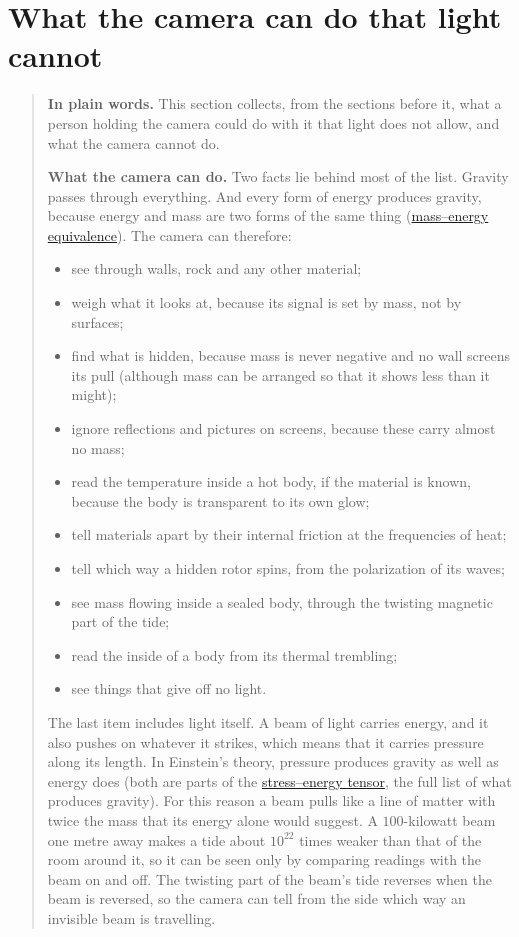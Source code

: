 \section{What the camera can do that light cannot}\label{sec:affordances}

\begin{quote}
\textbf{In plain words.} This section collects, from the sections before it,
what a person holding the camera could do with it that light does not allow,
and what the camera cannot do.

\textbf{What the camera can do.} Two facts lie behind most of the list. Gravity
passes through everything. And every form of energy produces gravity, because
energy and mass are two forms of the same thing
(\href{https://en.wikipedia.org/wiki/Mass-energy_equivalence}{mass--energy
equivalence}). The camera can therefore:
\begin{itemize}
\item see through walls, rock and any other material;
\item weigh what it looks at, because its signal is set by mass, not by
surfaces;
\item find what is hidden, because mass is never negative and no wall screens
its pull (although mass can be arranged so that it shows less than it might);
\item ignore reflections and pictures on screens, because these carry almost
no mass;
\item read the temperature inside a hot body, if the material is known,
because the body is transparent to its own glow;
\item tell materials apart by their internal friction at the frequencies of
heat;
\item tell which way a hidden rotor spins, from the polarization of its waves;
\item see mass flowing inside a sealed body, through the twisting magnetic part
of the tide;
\item read the inside of a body from its thermal trembling;
\item see things that give off no light.
\end{itemize}

The last item includes light itself. A beam of light carries energy, and it
also pushes on whatever it strikes, which means that it carries pressure along
its length. In Einstein's theory, pressure produces gravity as well as energy
does (both are parts of the
\href{https://en.wikipedia.org/wiki/Stress-energy_tensor}{stress--energy
tensor}, the full list of what produces gravity). For this reason a beam pulls
like a line of matter with twice the mass that its energy alone would suggest.
A $100$-kilowatt beam one metre away makes a tide about $10^{22}$ times weaker
than that of the room around it, so it can be seen only by comparing readings
with the beam on and off. The twisting part of the beam's tide reverses when
the beam is reversed, so the camera can tell from the side which way an
invisible beam is travelling.


\end{quote}
